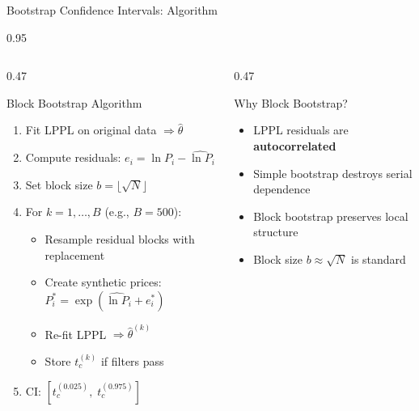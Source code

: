 \documentclass[9pt, aspectratio=169, t]{beamer}
\begin{document}
\begin{frame}{Bootstrap Confidence Intervals: Algorithm}
    \begin{cminipage}{0.95\textwidth}
    {\footnotesize
    \begin{columns}[T]
        \begin{column}{0.47\textwidth}
            \begin{block}{Block Bootstrap Algorithm}
                \begin{enumerate}\setlength{\itemsep}{1pt}
                    \item Fit LPPL on original data $\Rightarrow \hat{\theta}$
                    \item Compute residuals: $e_i = \ln P_i - \widehat{\ln P}_i$
                    \item Set block size $b = \lfloor\sqrt{N}\rfloor$
                    \item For $k = 1, \ldots, B$ (e.g., $B = 500$):
                    \begin{itemize}\setlength{\itemsep}{0pt}
                        \item Resample residual blocks with replacement
                        \item Create synthetic prices: $P^*_i = \exp(\widehat{\ln P}_i + e^*_i)$
                        \item Re-fit LPPL $\Rightarrow \hat{\theta}^{(k)}$
                        \item Store $t_c^{(k)}$ if filters pass
                    \end{itemize}
                    \item CI: $[t_c^{(0.025)},\; t_c^{(0.975)}]$
                \end{enumerate}
            \end{block}
        \end{column}
        \begin{column}{0.47\textwidth}
            \begin{alertblock}{Why Block Bootstrap?}
                \begin{itemize}\setlength{\itemsep}{1pt}
                    \item LPPL residuals are \textbf{autocorrelated}
                    \item Simple bootstrap destroys serial dependence
                    \item Block bootstrap preserves local structure
                    \item Block size $b \approx \sqrt{N}$ is standard
                \end{itemize}
            \end{alertblock}


\end{column}
\end{columns}}
\end{cminipage}
\end{frame}
\end{document}
